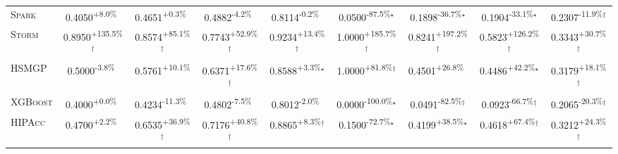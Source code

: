 \begin{table}[htbp]
\begin{tabular}{l|cccc|cccc}
\textsc{Spark} & \cellcolor{green!30}0.4050\textsuperscript{+8.0\%}$^{\,\,\,}$ & \cellcolor{green!30}0.4651\textsuperscript{+0.3\%}$^{\,\,\,}$ & \cellcolor{red!30}0.4882\textsuperscript{-4.2\%}$^{\,\,\,}$ & \cellcolor{red!30}0.8114\textsuperscript{-0.2\%}$^{\,\,\,}$ & \cellcolor{red!30}0.0500\textsuperscript{-87.5\%}$^\star$ & \cellcolor{red!30}0.1898\textsuperscript{-36.7\%}$^\star$ & \cellcolor{red!30}0.1904\textsuperscript{-33.1\%}$^\star$ & \cellcolor{red!30}0.2307\textsuperscript{-11.9\%}$^\dagger$ \\
\textsc{Storm} & \cellcolor{green!30}0.8950\textsuperscript{+135.5\%}$^\dagger$ & \cellcolor{green!30}0.8574\textsuperscript{+85.1\%}$^\dagger$ & \cellcolor{green!30}0.7743\textsuperscript{+52.9\%}$^\dagger$ & \cellcolor{green!30}0.9234\textsuperscript{+13.4\%}$^\dagger$ & \cellcolor{green!30}1.0000\textsuperscript{+185.7\%}$^\dagger$ & \cellcolor{green!30}0.8241\textsuperscript{+197.2\%}$^\dagger$ & \cellcolor{green!30}0.5823\textsuperscript{+126.2\%}$^\dagger$ & \cellcolor{green!30}0.3343\textsuperscript{+30.7\%}$^\dagger$ \\
\textsc{HSMGP} & \cellcolor{red!30}0.5000\textsuperscript{-3.8\%}$^{\,\,\,}$ & \cellcolor{green!30}0.5761\textsuperscript{+10.1\%}$^{\,\,\,}$ & \cellcolor{green!30}0.6371\textsuperscript{+17.6\%}$^\dagger$ & \cellcolor{green!30}0.8588\textsuperscript{+3.3\%}$^\star$ & \cellcolor{green!30}1.0000\textsuperscript{+81.8\%}$^\dagger$ & \cellcolor{green!30}0.4501\textsuperscript{+26.8\%}$^{\,\,\,}$ & \cellcolor{green!30}0.4486\textsuperscript{+42.2\%}$^\star$ & \cellcolor{green!30}0.3179\textsuperscript{+18.1\%}$^\dagger$ \\
\textsc{XGBoost} & \cellcolor{green!30}0.4000\textsuperscript{+0.0\%}$^{\,\,\,}$ & \cellcolor{red!30}0.4234\textsuperscript{-11.3\%}$^{\,\,\,}$ & \cellcolor{red!30}0.4802\textsuperscript{-7.5\%}$^{\,\,\,}$ & \cellcolor{red!30}0.8012\textsuperscript{-2.0\%}$^{\,\,\,}$ & \cellcolor{red!30}0.0000\textsuperscript{-100.0\%}$^\star$ & \cellcolor{red!30}0.0491\textsuperscript{-82.5\%}$^\dagger$ & \cellcolor{red!30}0.0923\textsuperscript{-66.7\%}$^\dagger$ & \cellcolor{red!30}0.2065\textsuperscript{-20.3\%}$^\dagger$ \\
\textsc{HIPAcc} & \cellcolor{green!30}0.4700\textsuperscript{+2.2\%}$^{\,\,\,}$ & \cellcolor{green!30}0.6535\textsuperscript{+36.9\%}$^\dagger$ & \cellcolor{green!30}0.7176\textsuperscript{+40.8\%}$^\dagger$ & \cellcolor{green!30}0.8865\textsuperscript{+8.3\%}$^\dagger$ & \cellcolor{red!30}0.1500\textsuperscript{-72.7\%}$^\star$ & \cellcolor{green!30}0.4199\textsuperscript{+38.5\%}$^\star$ & \cellcolor{green!30}0.4618\textsuperscript{+67.4\%}$^\dagger$ & \cellcolor{green!30}0.3212\textsuperscript{+24.3\%}$^\dagger$ \\

\end{tabular}
\end{table}

